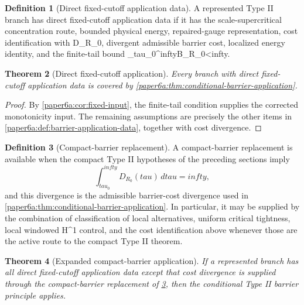\documentclass[11pt]{amsart}
\def\({}%
\def\){}%
\def\tilde#1{#1}%
\def\mathfrak#1{#1}%
\def\tau{tau}%
\def\infty{infty}%
\theoremstyle{plain}
\newtheorem{theorem}{Theorem}[section]
\theoremstyle{definition}
\newtheorem{definition}[theorem]{Definition}
\theoremstyle{remark}
\begin{document}
\begin{definition}[Direct fixed-cutoff application data]\label{paper6a:def:direct-fixed-data}
A represented Type II branch has direct fixed-cutoff application data if it has
the scale-supercritical concentration route, bounded physical energy,
repaired-gauge representation, cost identification with
\(\tilde{\mathfrak D}_{R_0}\), divergent admissible barrier cost, localized
energy identity, and the finite-tail bound
\(\int_{\tau_0}^{\infty}B_{R_0}<\infty\).
\end{definition}

\begin{theorem}[Direct fixed-cutoff application]\label{paper6a:thm:direct-fixed-application}
Every branch with direct fixed-cutoff application data is covered by
\cref{paper6a:thm:conditional-barrier-application}.
\end{theorem}

\begin{proof}
By \cref{paper6a:cor:fixed-input}, the finite-tail condition supplies the
corrected monotonicity input.  The remaining assumptions are precisely the other
items in \cref{paper6a:def:barrier-application-data}, together with cost
divergence.
\end{proof}

\begin{definition}[Compact-barrier replacement]\label{paper6a:def:compact-barrier-replacement}
A compact-barrier replacement is available when the compact Type II hypotheses
of the preceding sections imply
\[
  \int_{\tau_0}^{\infty}\tilde{\mathfrak D}_{R_0}(\tau)\,d\tau=\infty,
\]
and this divergence is the admissible barrier-cost divergence used in
\cref{paper6a:thm:conditional-barrier-application}.  In particular, it may be
supplied by the combination of classification of local alternatives, uniform
critical tightness, local windowed \(H^1\) control, and the cost identification
above whenever those are the active route to the compact Type II theorem.
\end{definition}

\begin{theorem}[Expanded compact-barrier application]\label{paper6a:thm:expanded-compact-application}
If a represented branch has all direct fixed-cutoff application data except
that cost divergence is supplied through the compact-barrier replacement of
\cref{paper6a:def:compact-barrier-replacement}, then the conditional Type II
barrier principle applies.
\end{theorem}
\end{document}

